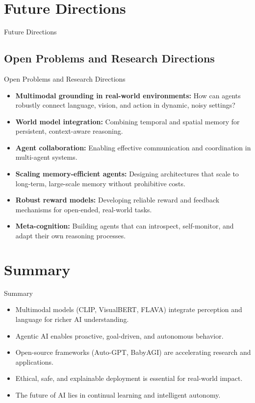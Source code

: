 \section{Future Directions}
\begin{frame}{}
    \LARGE Future Directions
\end{frame}


\subsection{Open Problems and Research Directions}
\begin{frame}[allowframebreaks]{Open Problems and Research Directions}
    \begin{itemize}
        \item \textbf{Multimodal grounding in real-world environments:} How can agents robustly connect language, vision, and action in dynamic, noisy settings?
        \item \textbf{World model integration:} Combining temporal and spatial memory for persistent, context-aware reasoning.
        \item \textbf{Agent collaboration:} Enabling effective communication and coordination in multi-agent systems.
        \item \textbf{Scaling memory-efficient agents:} Designing architectures that scale to long-term, large-scale memory without prohibitive costs.
        \item \textbf{Robust reward models:} Developing reliable reward and feedback mechanisms for open-ended, real-world tasks.
        \item \textbf{Meta-cognition:} Building agents that can introspect, self-monitor, and adapt their own reasoning processes.
    \end{itemize}
\end{frame}


\section{Summary}
\begin{frame}{Summary}
    \begin{itemize}
        \setlength{\itemsep}{1em}
        \item Multimodal models (CLIP, VisualBERT, FLAVA) integrate perception and language for richer AI understanding.
        \item Agentic AI enables proactive, goal-driven, and autonomous behavior.
        \item Open-source frameworks (Auto-GPT, BabyAGI) are accelerating research and applications.
        \item Ethical, safe, and explainable deployment is essential for real-world impact.
        \item The future of AI lies in continual learning and intelligent autonomy.
    \end{itemize}
\end{frame}


